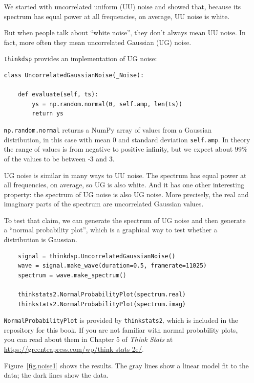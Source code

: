 \documentclass[12pt]{book}
\begin{document}
We started with uncorrelated uniform (UU) noise and showed that,
because its spectrum has equal power at all frequencies, on
average, UU noise is white.

But when people talk about ``white noise'', they don't always
mean UU noise.  In fact, more often they mean uncorrelated
Gaussian (UG) noise.

{\tt thinkdsp} provides an implementation of UG noise:

\begin{verbatim}
class UncorrelatedGaussianNoise(_Noise):

    def evaluate(self, ts):
        ys = np.random.normal(0, self.amp, len(ts))
        return ys
\end{verbatim}

{\tt np.random.normal} returns a NumPy array of values from a
Gaussian distribution, in this case with mean 0 and standard deviation
{\tt self.amp}.  In theory the range of values is from negative to
positive infinity, but we expect about 99\% of the values to be
between -3 and 3.

UG noise is similar in many ways to UU noise.  The spectrum has
equal power at all frequencies, on average, so UG is also white.
And it has one other interesting property: the spectrum of UG
noise is also UG noise.  More precisely, the real and imaginary
parts of the spectrum are uncorrelated Gaussian values.

To test that claim, we can generate the spectrum of UG noise and
then generate a ``normal probability plot'', which is a graphical
way to test whether a distribution is Gaussian.

\begin{verbatim}
    signal = thinkdsp.UncorrelatedGaussianNoise()
    wave = signal.make_wave(duration=0.5, framerate=11025)
    spectrum = wave.make_spectrum()

    thinkstats2.NormalProbabilityPlot(spectrum.real)
    thinkstats2.NormalProbabilityPlot(spectrum.imag)
\end{verbatim}

{\tt NormalProbabilityPlot} is provided by {\tt thinkstats2}, which is
included in the repository for this book.  If you are not familiar
with normal probability plots, you can read about them in Chapter 5
of {\it Think Stats} at \url{https://greenteapress.com/wp/think-stats-2e/}.

Figure~\ref{fig.noise1} shows the results.  The gray lines
show a linear model fit to the data; the dark lines show the
data.
\end{document}
